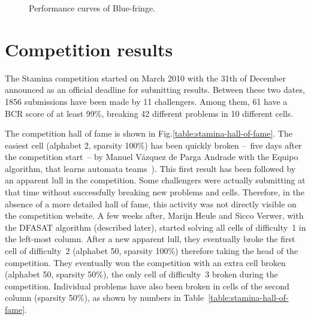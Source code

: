 \begin{figure}
\centering{}
  \caption{Performance curves of Blue-fringe\label{stamina:image:bluefringe-performance}.}
\end{figure}



\section{Competition results\label{section:stamina-results}}

The Stamina competition started on March 2010 with the 31th of December announced as an official deadline for submitting results. Between these two dates, 1856 submissions have been made by 11 challengers. Among them, 61 have a BCR score of at least 99\%, breaking 42 different problems in 10 different cells.

The competition hall of fame is shown in Fig.\ref{table:stamina-hall-of-fame}. The easiest cell (alphabet 2, sparsity 100\%) has been quickly broken --~five days after the competition start~-- by Manuel V\'azquez de Parga Andrade with the Equipo algorithm, that learns automata teams~\cite{Garcia:2010}). This first result has been followed by an apparent lull in the competition. Some challengers were actually submitting at that time without successfully breaking new problems and cells. Therefore, in the absence of a more detailed hall of fame, this activity was not directly visible on the competition website. A few weeks after, Marijn Heule and Sicco Verwer, with the DFASAT algorithm (described later), started solving all cells of difficulty~1 in the left-most column. After a new apparent lull, they eventually broke the first cell of difficulty~2 (alphabet 50, sparsity 100\%) therefore taking the head of the competition. They eventually won the competition with an extra cell broken (alphabet 50, sparsity 50\%), the only cell of difficulty~3 broken during the competition. Individual problems have also been broken in cells of the second column (sparsity 50\%), as shown by numbers in Table~\ref{table:stamina-hall-of-fame}.

